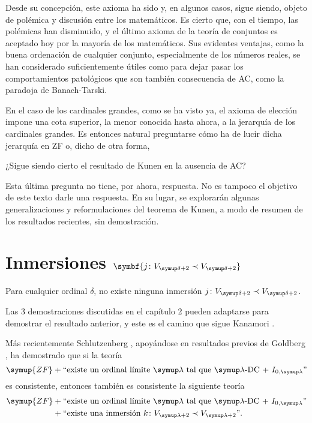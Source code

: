 \documentclass
[
  12pt,
  letterpaper,
  openany,
  oneside,
]{book}
\begin{document}
Desde su concepción, este axioma ha sido y, en algunos casos,
sigue siendo, objeto de polémica y discusión entre los matemáticos.
Es cierto que, con el tiempo, las polémicas han disminuido, y el último
axioma de la teoría de conjuntos es aceptado hoy por la mayoría
de los matemáticos.
Sus evidentes ventajas, como la buena ordenación de cualquier conjunto,
especialmente de los números reales, se han considerado suficientemente útiles
como para dejar pasar los comportamientos patológicos que son
también consecuencia de AC, como la paradoja de Banach-Tarski.

En el caso de los cardinales grandes, como se ha visto ya,
el axioma de elección impone una cota superior, la menor conocida hasta ahora,
a la jerarquía de los cardinales grandes. Es entonces natural preguntarse
cómo ha de lucir dicha jerarquía en ZF o,
dicho de otra forma,

\begin{ques}\label{ques:open}
¿Sigue siendo cierto el resultado de Kunen en la ausencia de AC?
\end{ques}

Esta última pregunta no tiene, por ahora, respuesta. No es tampoco
el objetivo de este texto darle una respuesta. En su lugar,
se explorarán algunas generalizaciones y reformulaciones del teorema
de Kunen, a modo de resumen de los resultados recientes, sin demostración.

\section%
{%
    Inmersiones \texorpdfstring{$\symbf{j\colon V_{\delta+2}\embed V_{\delta+2}}$}{j: V-> V}
}

\begin{teo}
    Para cualquier ordinal $\delta$, no existe ninguna inmersión
    $j\colon V_{\delta+2}\embed V_{\delta+2}$.
\end{teo}

Las 3 demostraciones discutidas en el capítulo 2 pueden adaptarse para demostrar
el resultado anterior, y este es el camino que sigue Kanamori
\autocite[Corolario 23.14]{kanamori_higher_2009}.

Más recientemente Schlutzenberg \autocite{schlutzenberg_consistency_2024},
apoyándose en resultados previos de Goldberg \autocite{goldberg_even_2021},
ha demostrado que si la teoría
\[
    \symup{ZF} + \text{``existe un ordinal límite $\lambda$ tal que $\lambda$-DC~+~$I_{0,\lambda}$''}
\]
es consistente, entonces también es consistente la siguiente teoría
\begin{align*}
    \symup{ZF} &+ \text{``existe un ordinal límite $\lambda$ tal que $\lambda$-DC~+~$I_{0,\lambda}$''}\\
               &+ \text{``existe una inmersión $k\colon V_{\lambda+2}\embed V_{\lambda+2}$''}.
\end{align*}
\end{document}
